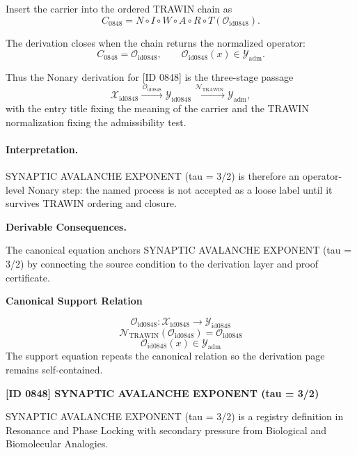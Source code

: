 Insert the carrier into the ordered TRAWIN chain as\[
C_{0848}=N\circ I\circ W\circ A\circ R\circ T(\mathcal{O}_{\mathrm{id0848}}).
\]

The derivation closes when the chain returns the normalized operator:\[
C_{0848}=\mathcal{O}_{\mathrm{id0848}},\qquad \mathcal{O}_{\mathrm{id0848}}(x)\in\mathcal{Y}_{\mathrm{adm}}.
\]

Thus the Nonary derivation for [ID 0848] is the three-stage passage
\[
\mathcal{X}_{\mathrm{id0848}}\xrightarrow{\,\mathcal{O}_{\mathrm{id0848}}\,} \mathcal{Y}_{\mathrm{id0848}}\xrightarrow{\,\mathcal{N}_{\mathrm{TRAWIN}}\,} \mathcal{Y}_{\mathrm{adm}},
\]
with the entry title fixing the meaning of the carrier and the TRAWIN normalization fixing the admissibility test.

\paragraph{Interpretation.} SYNAPTIC AVALANCHE EXPONENT (tau = 3/2) is therefore an operator-level Nonary step: the named process is not accepted as a loose label until it survives TRAWIN ordering and closure.

\par\vspace{0.35em}
\noindent\textbf{Derivable Consequences.}\quad
\begingroup
\footnotesize
\raggedright
The canonical equation anchors SYNAPTIC AVALANCHE EXPONENT (tau = 3/2) by connecting the source condition to the derivation layer and proof certificate.
\par\endgroup

\noindent\textbf{Canonical Support Relation}\par
\[
\mathcal{O}_{\mathrm{id0848}}:\mathcal{X}_{\mathrm{id0848}}\longrightarrow\mathcal{Y}_{\mathrm{id0848}}
\]
\[
\mathcal{N}_{\mathrm{TRAWIN}}(\mathcal{O}_{\mathrm{id0848}})=\mathcal{O}_{\mathrm{id0848}}
\]
\[
\mathcal{O}_{\mathrm{id0848}}(x)\in\mathcal{Y}_{\mathrm{adm}}
\]
\noindent The support equation repeats the canonical relation so the derivation page remains self-contained.\par

\clearpage
\noindent\textbf{[ID 0848] SYNAPTIC AVALANCHE EXPONENT (tau = 3/2)}\par
\vspace{0.35em}
\begingroup\small
{}
SYNAPTIC AVALANCHE EXPONENT (tau = 3/2) is a registry definition in Resonance and Phase Locking with secondary pressure from Biological and Biomolecular Analogies.

